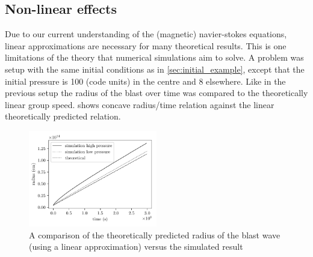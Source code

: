 \documentclass[a4paper]{article}
\numberwithin{figure}{section}
\numberwithin{equation}{section}
\begin{document}
\subsection{Non-linear effects} \label{sec:nonlinear_effects}
Due to our current understanding of the (magnetic) navier-stokes equations, linear approximations are necessary for many theoretical results. 
This is one limitations of the theory that numerical simulations aim to solve.
A problem was setup with the same initial conditions as in \cref{sec:initial_example}, except that the initial pressure is 100 (code units) in the centre and 8 elsewhere. 
Like in the previous setup the radius of the blast over time was compared to the theoretically linear group speed.
 shows concave radius/time relation against the linear theoretically predicted relation. 
\begin{figure}[h]
	\centering
	\includegraphics[width=0.5\textwidth]{figures/non_linear_effects.pdf}
	\caption{A comparison of the theoretically predicted radius of the blast wave (using a linear approximation) versus the simulated result}
	\label{fig:non_linear_effects}
\end{figure}

\pagebreak
\end{document}
